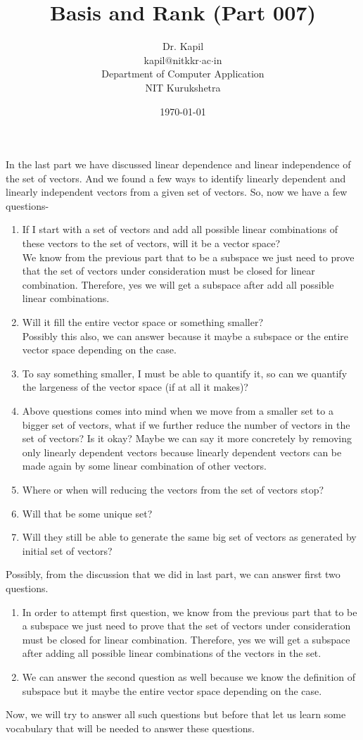 \documentclass{article}
\title{Basis and Rank (Part 007)}
\author{Dr. Kapil \\kapil$@$nitkkr$\cdot$ac$\cdot$in\\Department of Computer Application\\NIT Kurukshetra}
\date{\today}
\begin{document}
\maketitle
\thispagestyle{fancy}
In the last part we have discussed linear dependence and linear independence of the set of vectors. And we found a few ways to identify linearly dependent and linearly independent vectors from a given set of vectors. So, now we have a few questions-
\begin{enumerate}
    \item If I start with a set of vectors and add all possible linear combinations of these vectors to the set of vectors, will it be a vector space? \\
    We know from the previous part that to be a subspace we just need to prove that the set of vectors under consideration must be closed for linear combination. Therefore, yes we will get a subspace after add all possible linear combinations.
    \item Will it fill the entire vector space or something smaller?\\
    Possibly this also, we can answer because it maybe a subspace or the entire vector space depending on the case.
    \item To say something smaller, I must be able to quantify it, so can we quantify the largeness of the vector space (if at all it makes)?
    \item Above questions comes into mind when we move from a smaller set to a bigger set of vectors, what if we further reduce the number of vectors in the set of vectors? Is it okay? Maybe we can say it more concretely by removing only linearly dependent vectors because linearly dependent vectors can be made again by some linear combination of other vectors.
    \item Where or when will reducing the vectors from the set of vectors stop?
    \item Will that be some unique set?
    \item Will they still be able to generate the same big set of vectors as generated by initial set of vectors?
\end{enumerate}
Possibly, from the discussion that we did in last part, we can answer first two questions.
\begin{enumerate}
    \item  In order to attempt first question, we know from the previous part that to be a subspace we just need to prove that the set of vectors under consideration must be closed for linear combination. Therefore, yes we will get a subspace after adding all possible linear combinations of the vectors in the set.
    \item We can answer the second question as well because we know the definition of subspace but it maybe the entire vector space depending on the case.
\end{enumerate}
Now, we will try to answer all such questions but before that let us learn some vocabulary that will be needed to answer these questions.\par
\end{document}
